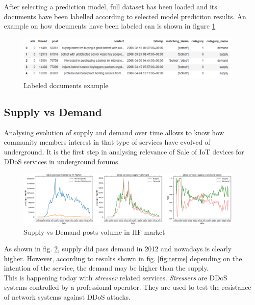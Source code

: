 After selecting a prediction model, full dataset has been loaded and its documents have been labelled according to selected model prediciton results. An example on how documents have been labeled can is shown in figure \ref{fig:labels}

\begin{figure}[H]
	\centering
	\includegraphics[width=1.0\textwidth]{figs/labels.png}
	\caption{Labeled documents example}
	\label{fig:labels}
\end{figure}

\subsection{Supply vs Demand}

Analysing evolution of supply and demand over time  allows to know how community members interest in that type of services have evolved of underground. It is the first step in analysing relevance of Sale of IoT devices for DDoS services in underground forums.

\begin{figure}[H]
	\centering
	\includegraphics[width=1.0\textwidth]{figs/supply_vs_demand_full.png}
	\caption{Supply vs Demand posts volume in HF market}
	\label{fig:supply_vs_demand_full}
\end{figure}

As shown in fig. \ref{fig:supply_vs_demand_full}, supply did pass demand in 2012 and nowadays is clearly higher. However, according to results shown in fig. \ref{fig:terms} depending on the intention of the service, the demand may be higher than the supply. \\
This is happening today with \textit{stresser} related services. \textit{Stressers} are DDoS systems controlled by a professional operator. They are used to test the resistance of network systems against DDoS attacks.

